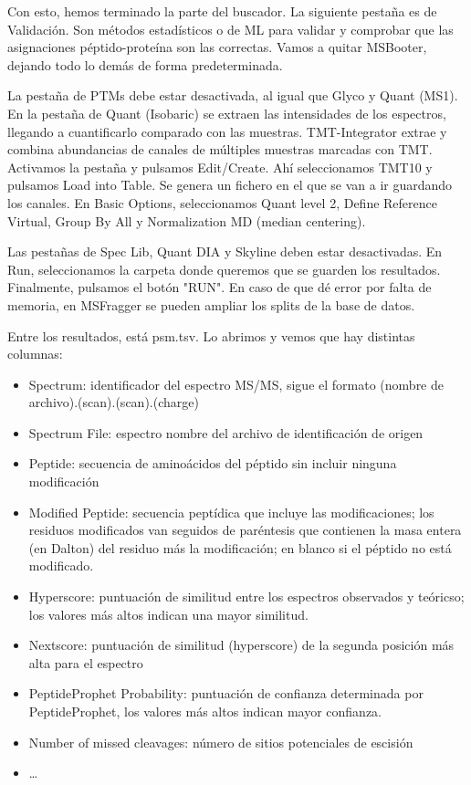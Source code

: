 \documentclass[nochap]{config/ejercicios}
\begin{document}
Con esto, hemos terminado la parte del buscador. La siguiente pestaña es de Validación. Son métodos estadísticos o de ML para validar y comprobar que las asignaciones péptido-proteína son las correctas. Vamos a quitar MSBooter, dejando todo lo demás de forma predeterminada. 

La pestaña de PTMs debe estar desactivada, al igual que Glyco y Quant (MS1). En la pestaña de Quant (Isobaric) se extraen las intensidades de los espectros, llegando a cuantificarlo comparado con las muestras. TMT-Integrator extrae y combina abundancias de canales de múltiples muestras marcadas con TMT. Activamos la pestaña y pulsamos Edit/Create. Ahí seleccionamos TMT10 y pulsamos Load into Table. Se genera un fichero en el que se van a ir guardando los canales. En Basic Options, seleccionamos Quant level 2, Define Reference Virtual, Group By All y Normalization MD (median centering).

Las pestañas de Spec Lib, Quant DIA y Skyline deben estar desactivadas. En Run, seleccionamos la carpeta donde queremos que se guarden los resultados. Finalmente, pulsamos el botón "RUN". En caso de que dé error por falta de memoria, en MSFragger se pueden ampliar los splits de la base de datos. 

Entre los resultados, está psm.tsv. Lo abrimos y vemos que hay distintas columnas:
\begin{itemize}
\item Spectrum: identificador del espectro MS/MS, sigue el formato (nombre de archivo).(scan).(scan).(charge)
\item Spectrum File: espectro nombre del archivo de identificación de origen
\item Peptide: secuencia de aminoácidos del péptido sin incluir ninguna modificación
\item Modified Peptide: secuencia peptídica que incluye las modificaciones; los residuos modificados van seguidos de paréntesis que contienen la masa entera (en Dalton) del residuo más la modificación; en blanco si el péptido no está modificado.
\item Hyperscore: puntuación de similitud entre los espectros observados y teóricso; los valores más altos indican una mayor similitud.
\item Nextscore: puntuación de similitud (hyperscore) de la segunda posición más alta para el espectro
\item PeptideProphet Probability: puntuación de confianza determinada por PeptideProphet, los valores más altos indican mayor confianza.
\item Number of missed cleavages: número de sitios potenciales de escisión
\item \ldots
\end{itemize}
\end{document}
